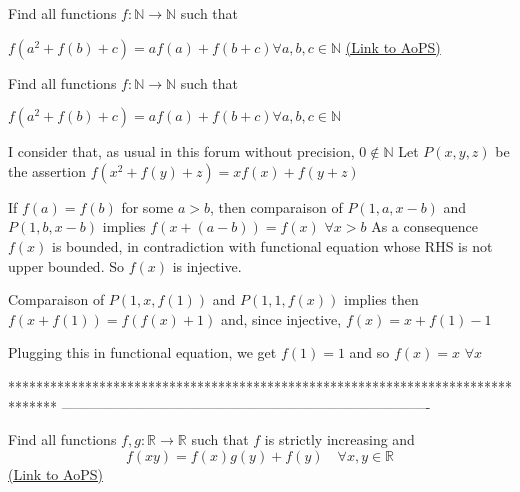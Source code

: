\begin{problem}
	Find all functions $f : \mathbb{N} \to \mathbb{N}$ such that

$f(a^2 + f(b) + c) = af(a) + f(b+c) \forall a,b,c \in \mathbb{N}$
	\flushright \href{https://artofproblemsolving.com/community/c6h578359}{(Link to AoPS)}
\end{problem}



\begin{solution}
	\begin{tcolorbox}Find all functions $f : \mathbb{N} \to \mathbb{N}$ such that

$f(a^2 + f(b) + c) = af(a) + f(b+c) \forall a,b,c \in \mathbb{N}$\end{tcolorbox}
I consider that, as usual in this forum without precision, $0\notin\mathbb N$
Let $P(x,y,z)$ be the assertion $f(x^2+f(y)+z)=xf(x)+f(y+z)$

If $f(a)=f(b)$ for some $a>b$, then comparaison of $P(1,a,x-b)$ and $P(1,b,x-b)$ implies $f(x+(a-b))=f(x)$ $\forall x>b$
As a consequence $f(x)$ is bounded, in contradiction with functional equation whose RHS is not upper bounded.
So $f(x)$ is injective.

Comparaison of $P(1,x,f(1))$ and $P(1,1,f(x))$ implies then $f(x+f(1))=f(f(x)+1)$ and, since injective, $f(x)=x+f(1)-1$

Plugging this in functional equation, we get $f(1)=1$ and so $\boxed{f(x)=x}$ $\forall x$
\end{solution}
*******************************************************************************
-------------------------------------------------------------------------------

\begin{problem}
	Find all functions $f,g:\mathbb{R}\to\mathbb{R}$ such that $f$ is strictly increasing and \[f(xy)=f(x)g(y)+f(y)\quad \forall x,y\in \mathbb{R}\]
	\flushright \href{https://artofproblemsolving.com/community/c6h578361}{(Link to AoPS)}
\end{problem}



